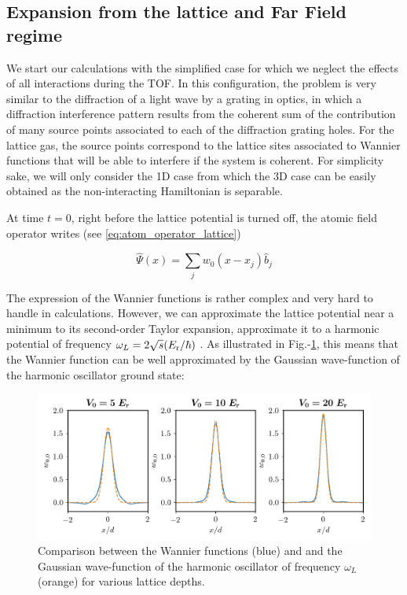 \subsection{Expansion from the lattice and Far Field regime}

We start our calculations with the simplified case for which we neglect the effects of all interactions during the TOF. In this configuration, the problem is very similar to the diffraction of a light wave by a grating in optics, in which a diffraction interference pattern results from the coherent sum of the contribution of many source points associated to each of the diffraction grating holes. For the lattice gas, the source points correspond to the lattice sites associated to Wannier functions that will be able to interfere if the system is coherent. For simplicity sake, we will only consider the 1D case from which the 3D case can be easily obtained as the non-interacting Hamiltonian is separable.

At time $t=0$, right before the lattice potential is turned off, the atomic field operator writes (see \ref{eq:atom_operator_lattice})

\begin{equation}
    \hat{\Psi}(x)= \sum_{j} w_{0}(x-x_j) \hat{b}_{j} 
    \label{eq:field_operator}
\end{equation}



\noindent The expression of the Wannier functions is rather complex and very hard to handle in calculations. However, we can approximate the lattice potential near a minimum to its second-order Taylor expansion, \ie approximate it to a harmonic potential of frequency $\omega_L=2 \sqrt{s} (E_{\rm{r}}/\hbar)$ \cite{toth2008theory}. As illustrated in Fig.-\ref{fig:wannier_oh}, this means that the Wannier function can be well approximated by the Gaussian wave-function of the harmonic oscillator ground state:

\begin{figure}
    \centering
    \includegraphics[width=\textwidth]{Fig/Chapter2/wannier_oh.png}
    \caption[Comparison between the Wannier functions and and the Gaussian wave-function of the harmonic oscillator of frequency $\omega_L$ for various lattice depths.]{Comparison between the Wannier functions (blue) and and the Gaussian wave-function of the harmonic oscillator of frequency $\omega_L$ (orange) for various lattice depths.}
    \label{fig:wannier_oh}
\end{figure}


